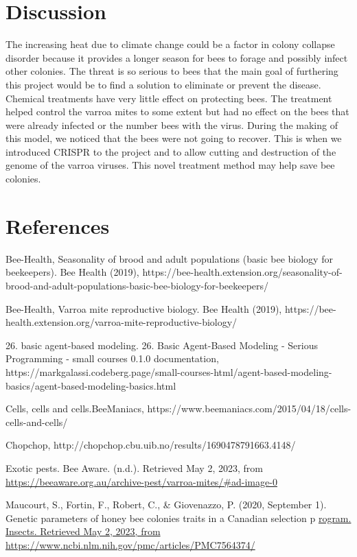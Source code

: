 \documentclass[final,5p,times,twocolumn,authoryear]{elsarticle}
\begin{document}
\section*{Discussion}
\label{Discussion}
The increasing heat due to climate change could be a factor in colony collapse disorder because it provides a longer season for bees to forage and possibly infect other colonies. The threat is so serious to bees that the main goal of furthering this project would be to find a solution to eliminate or prevent the disease. Chemical treatments have very little effect on protecting bees. The treatment helped control the varroa mites to some extent but had no effect on the bees that were already infected or the number bees with the virus. During the making of this model, we noticed that the bees were not going to recover. This is when we introduced CRISPR to the project and to allow cutting and destruction of the genome of the varroa viruses. This novel treatment method may help save bee colonies.  

\section{References}
\label{References}
Bee-Health, Seasonality of brood and adult populations (basic bee biology for beekeepers). Bee Health (2019), https://bee-health.extension.org/seasonality-of-brood-and-adult-populations-basic-bee-biology-for-beekeepers/ 

 Bee-Health, Varroa mite reproductive biology. Bee Health (2019), https://bee-health.extension.org/varroa-mite-reproductive-biology/ 

 26. basic agent-based modeling. 26. Basic Agent-Based Modeling - Serious Programming - small courses 0.1.0 documentation, https://markgalassi.codeberg.page/small-courses-html/agent-based-modeling-basics/agent-based-modeling-basics.html 

 Cells, cells and cells.BeeManiacs, https://www.beemaniacs.com/2015/04/18/cells-cells-and-cells/ 

 Chopchop, http://chopchop.cbu.uib.no/results/1690478791663.4148/ 

 Exotic pests. Bee Aware. (n.d.). Retrieved May 2, 2023, from \url{https://beeaware.org.au/archive-pest/varroa-mites/#ad-image-0}

 Maucourt, S., Fortin, F., Robert, C., \& Giovenazzo, P. (2020, September 1). Genetic parameters of honey bee colonies traits in a Canadian selection p \url{rogram. Insects. Retrieved May 2, 2023, from https://www.ncbi.nlm.nih.gov/pmc/articles/PMC7564374/}
\end{document}
